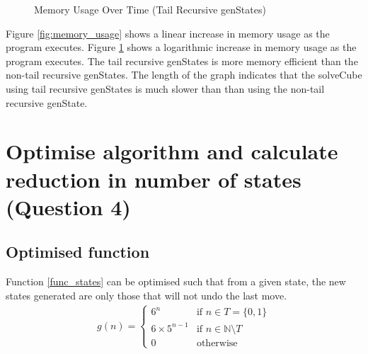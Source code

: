 \documentclass[]{article}
\begin{document}
  \begin{figure}[H]
  	\centering
  	\noindent{}
  	\caption{Memory Usage Over Time (Tail Recursive genStates)}
  	\label{fig:memory_usageTail}
  \end{figure}

 Figure \ref{fig:memory_usage} shows a linear increase in memory usage as the program executes. Figure \ref{fig:memory_usageTail} shows a logarithmic increase in memory usage as the program executes. The tail recursive genStates is more memory efficient than the non-tail recursive genStates. The length of the graph indicates that the solveCube using tail recursive genStates is much slower than than using the non-tail recursive genState. 

\section{Optimise algorithm and calculate reduction in number of states (Question 4)}
\subsection{Optimised function}							
Function \ref{func_states} can be optimised such that from a given state, the new states generated are only those that will not undo the last move.
\begin{equation}
\begin{split}
g(n) =
\begin{cases}
	6^{n} & \text{if }n \in T = \{0, 1\}\\
	6 \times 5^{n-1} & \text{if }n \in \mathbb{N} \setminus T\\
	0 & \text{otherwise}
\end{cases}
\end{split}
\label{fun:func_states_optimised}
\end{equation}
\end{document}
